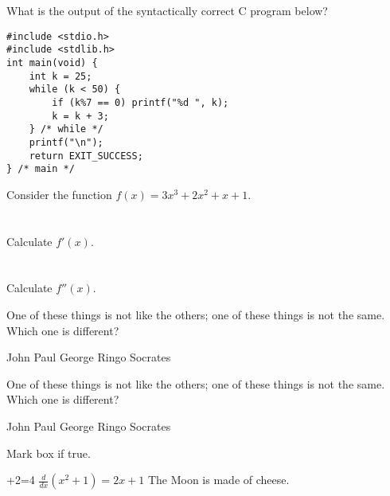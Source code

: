 \documentclass[12pt]{exam}
\begin{document}

\begin{questions}

\question[2] What is the output of the syntactically correct C program below?
\vspace{0.3cm}
\begin{lstlisting}
#include <stdio.h>
#include <stdlib.h>
int main(void) {
	int k = 25;
	while (k < 50) {
		if (k%7 == 0) printf("%d ", k);
		k = k + 3;
	} /* while */
	printf("\n");
	return EXIT_SUCCESS;
} /* main */
\end{lstlisting}
\makeemptybox{1cm}
\addpoints

\question[20] Consider the function $f(x)=3x^3+2x^2+x+1$.
\noaddpoints %
\begin{parts}
\part[10]{} Calculate $f'(x)$.
\part[10]{} Calculate $f''(x)$.
\end{parts}
\addpoints

\question[2] One of these things is not like the others; one of these
things is not the same. Which one is different?
\begin{choices}
\choice John
\choice Paul
\choice George
\choice Ringo
\choice Socrates
\end{choices}

\question[2] One of these things is not like the others; one of these
things is not the same. Which one is different?
\begin{oneparchoices}
\choice John
\choice Paul
\choice George
\choice Ringo
\choice Socrates
\end{oneparchoices}

\question[3] Mark box if true.
\addpoints
\begin{checkboxes}
+2=4
\choice $\frac{d}{dx} (x^2+1) = 2x+1$
\choice The Moon is made of cheese.
\end{checkboxes}


\end{questions}
\end{document}
